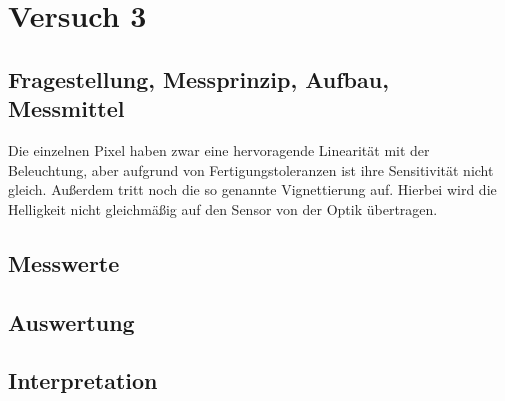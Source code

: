 \documentclass[TGAI_Laborbericht.tex]{subfiles}
\begin{document}
\chapter{Versuch 3}
\label{chap:VERSUCH_3}

\section{Fragestellung, Messprinzip, Aufbau, Messmittel}
\label{chap:VERSUCH_3_FRAGESTELLUNG}
Die einzelnen Pixel haben zwar eine hervoragende Linearität mit der Beleuchtung, aber aufgrund von Fertigungstoleranzen ist ihre Sensitivität nicht gleich. Außerdem tritt noch die so genannte Vignettierung auf. Hierbei wird die Helligkeit nicht gleichmäßig auf den Sensor von der Optik übertragen.
\section{Messwerte}
\label{chap:VERSUCH_3_MESSWERTE}

\section{Auswertung}
\label{chap:VERSUCH_3_AUSWERTUNG}

\section{Interpretation}
\label{chap:VERSUCH_3_INTERPRETATION}
\end{document}

